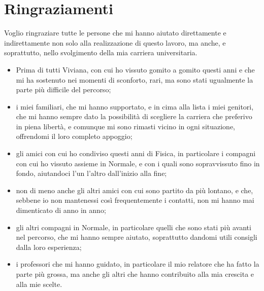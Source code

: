 
\cleardoublepage
{}
{}

\chapter*{Ringraziamenti}
%
	{}
\thispagestyle{empty}




\vspace{5pt}

Voglio ringraziare tutte le persone che mi hanno aiutato direttamente e indirettamente non solo alla realizzazione di questo lavoro, ma anche, e soprattutto, nello svolgimento della mia carriera universitaria.

\begin{itemize}
	\item Prima di tutti Viviana, con cui ho vissuto gomito a gomito questi anni e che mi ha sostenuto nei momenti di sconforto, rari, ma sono stati ugualmente la parte più difficile del percorso;
	\item i miei familiari, che mi hanno supportato, e in cima alla lista i miei genitori, che mi hanno sempre dato la possibilità di scegliere la carriera che preferivo in piena libertà, e comunque mi sono rimasti vicino in ogni situazione, offrendomi il loro completo appoggio;
	\item gli amici con cui ho condiviso questi anni di Fisica, in particolare i compagni con cui ho vissuto assieme in Normale, e con i quali sono sopravvissuto fino in fondo, aiutandoci l'un l'altro dall'inizio alla fine;
	\item non di meno anche gli altri amici con cui sono partito da più lontano, e che, sebbene io non mantenessi così frequentemente i contatti, non mi hanno mai dimenticato di anno in anno;
	\item gli altri compagni in Normale, in particolare quelli che sono stati più avanti nel percorso, che mi hanno sempre aiutato, soprattutto dandomi utili consigli dalla loro esperienza;
	\item i professori che mi hanno guidato, in particolare il mio relatore che ha fatto la parte più grossa, ma anche gli altri che hanno contribuito alla mia crescita e alla mie scelte.
\end{itemize}

